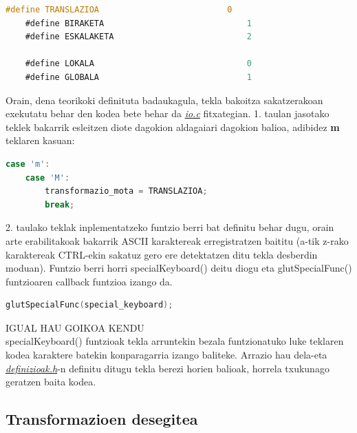 \documentclass[12pt]{article}
\newcommand{\fitxategi}[1] {\underline{\textit{#1}}}
\newcommand{\tekla}[1] {\textbf{#1}}
\begin{document}
\begin{center}
	\begin{lstlisting}[language=C, basicstyle=\footnotesize]
	#define TRANSLAZIOA                          0
	#define BIRAKETA                             1
	#define ESKALAKETA                           2
	
	#define LOKALA                               0
	#define GLOBALA                              1
	\end{lstlisting}
\end{center}


Orain, dena teorikoki definituta badaukagula, tekla bakoitza sakatzerakoan exekutatu behar den kodea bete behar da \fitxategi{io.c} fitxategian. 1. taulan jasotako teklek bakarrik esleitzen diote dagokion aldagaiari dagokion balioa, adibidez \tekla{m} teklaren kasuan:

\begin{center}
	\begin{lstlisting}[language=C, basicstyle=\footnotesize]
	case 'm':
	case 'M':
		transformazio_mota = TRANSLAZIOA;
		break;
	\end{lstlisting}
\end{center}


2. taulako teklak inplementatzeko funtzio berri bat definitu behar dugu, orain arte erabilitakoak bakarrik ASCII karaktereak erregistratzen baititu (a-tik z-rako karaktereak CTRL-ekin sakatuz gero ere detektatzen ditu tekla desberdin moduan).
Funtzio berri horri specialKeyboard() deitu diogu eta glutSpecialFunc()\cite{glutSpecialFunc} funtzioaren callback funtzioa\cite{callback} izango da.

\begin{center}
	\begin{lstlisting}[language=C, basicstyle=\footnotesize]
	glutSpecialFunc(special_keyboard);
	\end{lstlisting}
\end{center}

IGUAL HAU GOIKOA KENDU\\

specialKeyboard() funtzioak tekla arruntekin bezala funtzionatuko luke teklaren kodea karaktere batekin konparagarria izango baliteke. Arrazio hau dela-eta \fitxategi{definizioak.h}-n definitu ditugu tekla berezi horien balioak, horrela txukunago geratzen baita kodea.




\subsection{Transformazioen desegitea}\label{procedure}
\end{document}
